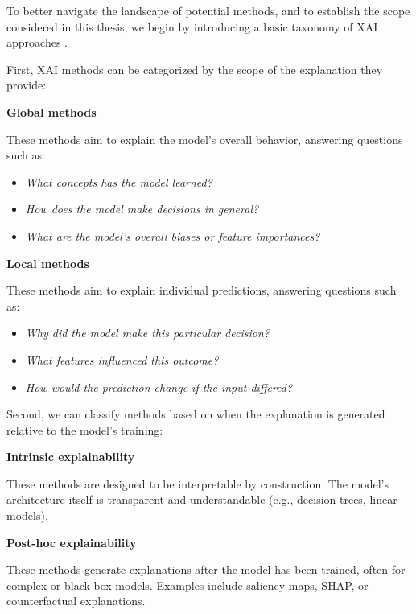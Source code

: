 To better navigate the landscape of potential methods, and to establish the scope considered in this thesis, we begin by introducing a basic taxonomy of XAI approaches \cite{guidotti2018survey}.

First, XAI methods can be categorized by the scope of the explanation they provide:

\begin{multicols}{2}
    \centering \textbf{Global methods} \\[4pt]
    \raggedright
    These methods aim to explain the model's overall behavior, answering questions such as:
    \vspace{0.25cm}
    \begin{itemize}
        \item \textit{What concepts has the model learned?}
        \item \textit{How does the model make decisions in general?}
        \item \textit{What are the model's overall biases or feature importances?}
    \end{itemize}

    \columnbreak

    \centering \textbf{Local methods} \\[4pt]
    \raggedright
    These methods aim to explain individual predictions, answering questions such as:
    \vspace{0.25cm}
    \begin{itemize}
        \item \textit{Why did the model make this particular decision?}
        \item \textit{What features influenced this outcome?}
        \item \textit{How would the prediction change if the input differed?}
    \end{itemize}
\end{multicols}

Second, we can classify methods based on when the explanation is generated relative to the model's training:

\begin{multicols}{2}
    \centering \textbf{Intrinsic explainability} \\[4pt]
    \raggedright
    These methods are designed to be interpretable by construction.
    The model's architecture itself is transparent and understandable (e.g., decision trees, linear models).

    \columnbreak

    \centering \textbf{Post-hoc explainability} \\[4pt]
    \raggedright
    These methods generate explanations after the model has been trained, often for complex or black-box models.
    Examples include saliency maps, SHAP, or counterfactual explanations.
\end{multicols}

